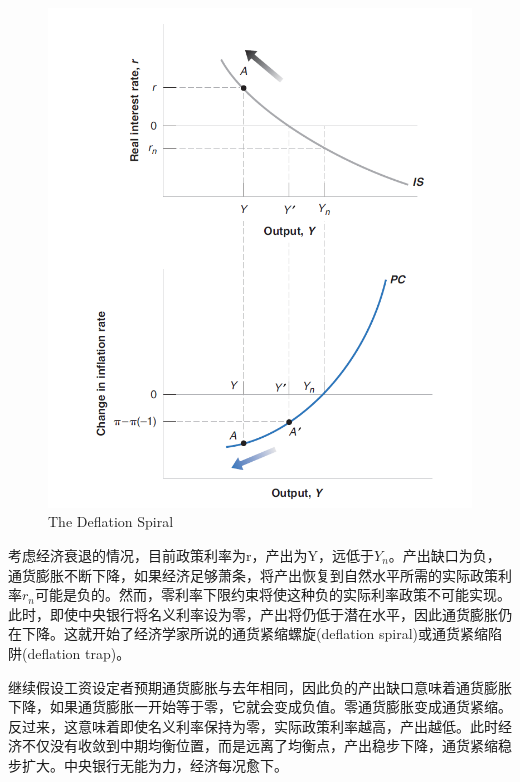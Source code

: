 \documentclass{article}
\begin{document}
\begin{figure}[H] %
	\centering %
	\includegraphics[width=1\textwidth]{9_3} %
	\caption{The Deflation Spiral} %
	\label{Fig.main4} %
\end{figure}

考虑经济衰退的情况，目前政策利率为r，产出为Y，远低于$ Y_n $。产出缺口为负，通货膨胀不断下降，如果经济足够萧条，将产出恢复到自然水平所需的实际政策利率$ r_n $可能是负的。然而，零利率下限约束将使这种负的实际利率政策不可能实现。此时，即使中央银行将名义利率设为零，产出将仍低于潜在水平，因此通货膨胀仍在下降。这就开始了经济学家所说的通货紧缩螺旋(deflation spiral)或通货紧缩陷阱(deflation trap)。

继续假设工资设定者预期通货膨胀与去年相同，因此负的产出缺口意味着通货膨胀下降，如果通货膨胀一开始等于零，它就会变成负值。零通货膨胀变成通货紧缩。反过来，这意味着即使名义利率保持为零，实际政策利率越高，产出越低。此时经济不仅没有收敛到中期均衡位置，而是远离了均衡点，产出稳步下降，通货紧缩稳步扩大。中央银行无能为力，经济每况愈下。
\end{document}
